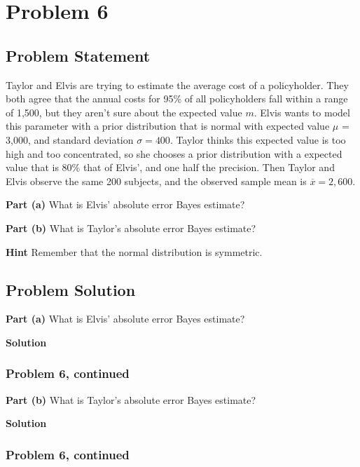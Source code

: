 \documentclass[12pt]{article}
\theoremstyle{definition}
\begin{document}
\newpage
\section*{Problem 6}

\subsection*{Problem Statement}

Taylor and Elvis are trying to estimate the average cost of a policyholder. They both agree that the annual costs for 95\% of all policyholders fall within a range of 1,500, but they aren't sure about the expected value $m$. Elvis wants to model this parameter with a prior distribution that is normal with expected value $\mu$ = 3,000, and standard deviation $\sigma = 400$. Taylor thinks this expected value is too high and too concentrated, so she chooses a prior distribution with a expected value that is 80\% that of Elvis', and one half the precision. Then Taylor and Elvis observe the same 200 subjects, and the observed sample mean is $\overline{x} = 2,600$.

\bigskip
\noindent
{\bf Part (a)} What is Elvis' absolute error Bayes estimate?

\bigskip
\noindent
{\bf Part (b)} What is Taylor's absolute error Bayes estimate?

\bigskip
\noindent
{\bf Hint} Remember that the normal distribution is symmetric.

\subsection*{Problem Solution}

\bigskip
\noindent
{\bf Part (a)} What is Elvis' absolute error Bayes estimate?

\bigskip
\noindent
{\bf Solution}


\newpage
\subsubsection*{Problem 6, continued}

\vspace{3.5in}
\noindent
{\bf Part (b)} What is Taylor's absolute error Bayes estimate?

\bigskip
\noindent
{\bf Solution}

\newpage
\subsubsection*{Problem 6, continued}
\end{document}
